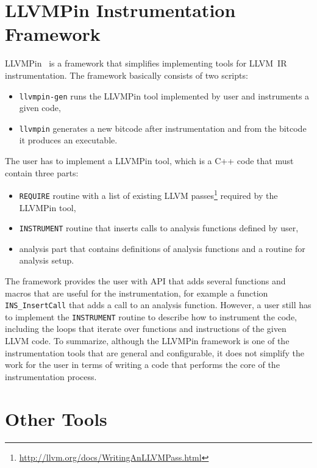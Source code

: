 \section{LLVMPin Instrumentation Framework}

LLVMPin~\cite{llvmpin} is a framework that simplifies implementing tools for
LLVM~IR instrumentation. The framework basically consists of two scripts:

\begin{itemize}
    \item \texttt{llvmpin-gen} runs the LLVMPin tool implemented by
          user and instruments a given code,
    \item \texttt{llvmpin} generates a new
	  bitcode after instrumentation and from the bitcode it produces an
          executable.
\end{itemize}

The user has to implement a LLVMPin tool, which is a C++ code that must contain three
parts:

\begin{itemize}
    \item \texttt{REQUIRE} routine with a list of existing LLVM
          passes\footnote{\url{http://llvm.org/docs/WritingAnLLVMPass.html}} required by
          the LLVMPin tool,
    \item \texttt{INSTRUMENT} routine that inserts calls to analysis functions
          defined by user,
    \item analysis part that contains definitions of analysis functions and a
          routine for analysis setup.
\end{itemize}

The framework provides the user with API that adds several functions and macros
that are useful for the instrumentation, for example a function
\texttt{INS\_InsertCall} that adds a call to an analysis function. However, a
user still has to implement the \texttt{INSTRUMENT} routine to describe how to
instrument the code, including the loops that iterate over functions and
instructions of the given LLVM code. To summarize, although the LLVMPin
framework is one of the instrumentation tools that are general and
configurable, it does not simplify the work for the user in terms of writing a
code that performs the core of the instrumentation process.

\section{Other Tools}

